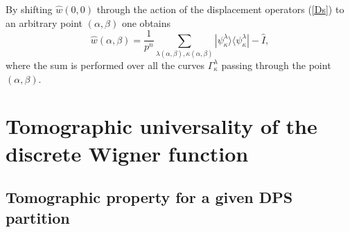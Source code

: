 \documentclass{article}
\begin{document}
By shifting $\hat{w}\left(0,0\right)$ through the action of the
displacement operators (\ref{Ds}) to an arbitrary point $(\alpha,\beta )$
one obtains 
\begin{equation}
  \hat{w}(\alpha,\beta)
  = \frac{1}{p^{n}} \sum_{\lambda (\alpha,\beta),\kappa(\alpha ,\beta )}
  |\psi_{\kappa}^{\lambda}\rangle \langle \psi_{\kappa}^{\lambda }|
  - \hat{I},
  \label{wab}
\end{equation}
where the sum is performed over all the curves $\Gamma_{\kappa }^{\lambda }$
passing through the point $(\alpha,\beta)$.

\section{Tomographic universality of the discrete Wigner function}

\subsection{Tomographic property for a given DPS partition}
\end{document}
